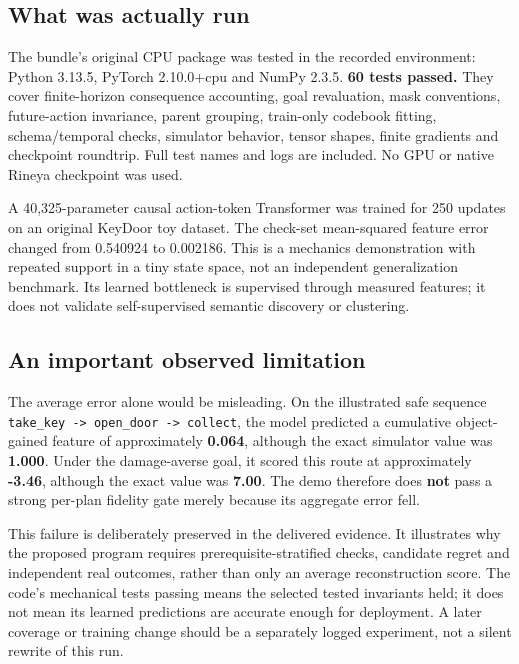 \documentclass[
  11pt,
  a4paper,
]{article}
\begin{document}
\subsection{What was actually run}\label{what-was-actually-run}

The bundle's original CPU package was tested in the recorded
environment: Python 3.13.5, PyTorch 2.10.0+cpu and NumPy 2.3.5.
\textbf{60 tests passed.} They cover finite-horizon consequence
accounting, goal revaluation, mask conventions, future-action
invariance, parent grouping, train-only codebook fitting,
schema/temporal checks, simulator behavior, tensor shapes, finite
gradients and checkpoint roundtrip. Full test names and logs are
included. No GPU or native Rineya checkpoint was used.

A 40,325-parameter causal action-token Transformer was trained for 250
updates on an original KeyDoor toy dataset. The check-set mean-squared
feature error changed from 0.540924 to 0.002186. This is a mechanics
demonstration with repeated support in a tiny state space, not an
independent generalization benchmark. Its learned bottleneck is
supervised through measured features; it does not validate
self-supervised semantic discovery or clustering.

\subsection{An important observed
limitation}\label{an-important-observed-limitation}

The average error alone would be misleading. On the illustrated safe
sequence
\texttt{take\_key\ -\textgreater{}\ open\_door\ -\textgreater{}\ collect},
the model predicted a cumulative object-gained feature of approximately
\textbf{0.064}, although the exact simulator value was \textbf{1.000}.
Under the damage-averse goal, it scored this route at approximately
\textbf{-3.46}, although the exact value was \textbf{7.00}. The demo
therefore does \textbf{not} pass a strong per-plan fidelity gate merely
because its aggregate error fell.

This failure is deliberately preserved in the delivered evidence. It
illustrates why the proposed program requires prerequisite-stratified
checks, candidate regret and independent real outcomes, rather than only
an average reconstruction score. The code's mechanical tests passing
means the selected tested invariants held; it does not mean its learned
predictions are accurate enough for deployment. A later coverage or
training change should be a separately logged experiment, not a silent
rewrite of this run.
\end{document}
